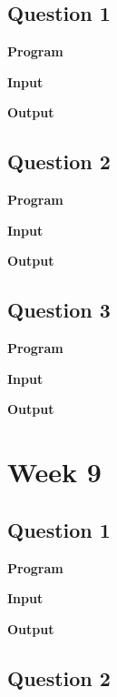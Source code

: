 \documentclass{article}
\begin{document}
\subsection{Question 1}

\newline 

\noindent \textbf{\large{Program}}

\newpage
\noindent \textbf{\large{Input}}

\noindent \textbf{\large{Output}}


\newpage
\subsection{Question 2}

\newline 

\noindent \textbf{\large{Program}}

\newpage
\noindent \textbf{\large{Input}}

\noindent \textbf{\large{Output}}


\newpage
\subsection{Question 3}

\newline 

\noindent \textbf{\large{Program}}

\newpage
\noindent \textbf{\large{Input}}

\noindent \textbf{\large{Output}}

\newpage
\section{Week 9}

\subsection{Question 1}

\newline 

\noindent \textbf{\large{Program}}

\newpage
\noindent \textbf{\large{Input}}

\noindent \textbf{\large{Output}}


\newpage
\subsection{Question 2}

\newline 
\end{document}
